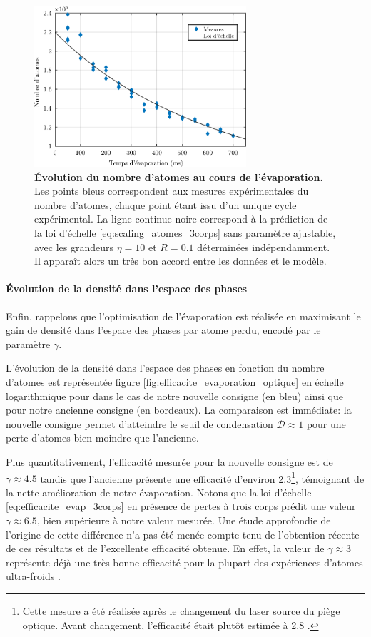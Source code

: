 \begin{figure}
\centering
\includegraphics[width=0.7\textwidth]{Fig/modif_exp/Nombre_atomes_evap.pdf}
\caption{\textbf{Évolution du nombre d'atomes au cours de l'évaporation.} Les points bleus correspondent aux mesures expérimentales du nombre d'atomes, chaque point étant issu d'un unique cycle expérimental. La ligne continue noire correspond à la prédiction de la loi d'échelle \ref{eq:scaling_atomes_3corps} sans paramètre ajustable, avec les grandeurs $\eta=10$ et $R=0.1$ déterminées indépendamment. Il apparaît alors un très bon accord entre les données et le modèle.}
\label{fig:nombre_atomes_evap}
\end{figure}




\paragraph*{Évolution de la densité dans l'espace des phases}
Enfin, rappelons que l'optimisation de l'évaporation est réalisée en maximisant le gain de densité dans l'espace des phases par atome perdu, encodé par le paramètre $\gamma$. 

L'évolution de la densité dans l'espace des phases en fonction du nombre d'atomes est représentée figure \ref{fig:efficacite_evaporation_optique} en échelle logarithmique pour dans le cas de notre nouvelle consigne (en bleu) ainsi que pour notre ancienne consigne (en bordeaux). La comparaison est immédiate: la nouvelle consigne permet d'atteindre le seuil de condensation $\mathcal{D}\approx 1$ pour une perte d'atomes bien moindre que l'ancienne.

Plus quantitativement, l'efficacité mesurée pour la nouvelle consigne est de $\gamma\approx 4.5$ tandis que l'ancienne présente une efficacité d'environ 2.3\footnote{Cette mesure a été réalisée après le changement du laser source du piège optique. Avant changement, l'efficacité était plutôt estimée à 2.8 \citep{jendrzejewski2012quantum}.}, témoignant de la nette amélioration de notre évaporation. Notons que la loi d'échelle \ref{eq:efficacite_evap_3corps} en présence de pertes à trois corps prédit une valeur $\gamma\approx 6.5$, bien supérieure à notre valeur mesurée. Une étude approfondie de l'origine de cette différence n'a pas été menée compte-tenu de l'obtention récente de ces résultats et de l'excellente efficacité obtenue. En effet, la valeur de $\gamma\approx 3$ représente déjà une très bonne efficacité pour la plupart des expériences d'atomes ultra-froids \citep{barrett2001all}\citep{hung2008accelerating}.

